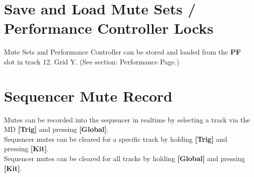 \section{Save and Load Mute Sets / Performance Controller Locks}
Mute Sets and Performance Controller can be stored and loaded from the \textbf{PF} slot in track 12, Grid Y. (See section: Performance Page.)


\section{Sequencer Mute Record}
Mutes can be recorded into the sequencer in realtime by selecting a track via the MD \textbf{[Trig]} and pressing \textbf{[Global]}.\\
Sequencer mutes can be cleared for a specific track by holding \textbf{[Trig]} and pressing \textbf{[Kit]}.\\
Sequencer mutes can be cleared for all tracks by holding \textbf{[Global]} and pressing \textbf{[Kit]}.


